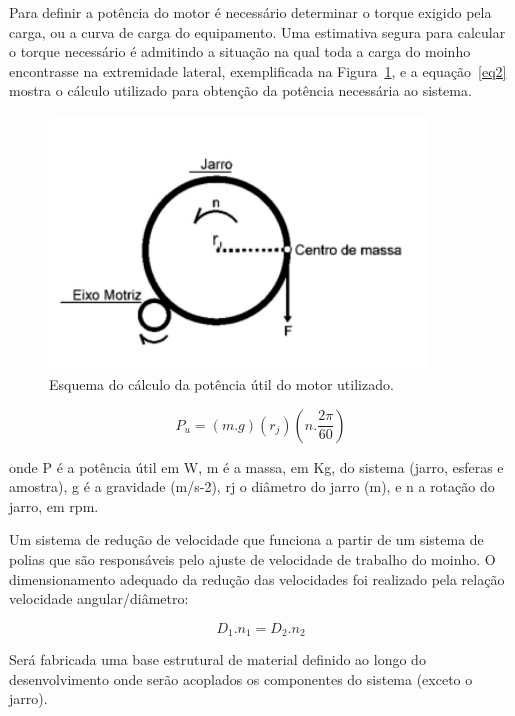 \documentclass[a4paper, 12pt, brazil]{article}
\begin{document}
Para definir a potência do motor é necessário determinar o torque exigido pela carga, ou a curva de carga do equipamento. Uma estimativa segura para calcular o torque necessário é admitindo a situação na qual toda a carga do moinho encontrasse na extremidade lateral, exemplificada na Figura~\ref{fig:potencia}, e a equação~\ref{eq2} mostra o cálculo utilizado para obtenção da potência necessária ao sistema.

\begin{figure}[!ht]
 			\begin{center}
				\includegraphics[width=100mm,scale=0.5]{potencia.png}
			\end{center}
       		\caption{\label{fig:potencia}Esquema do cálculo da potência útil do motor utilizado.}
 	\end{figure}   

\begin{equation}
P_u=(m.g)(r_j)(n.\frac{2\pi}{60})
\label{eq2}
\end{equation}

\par
onde P é a potência útil em W, m é a massa, em Kg, do sistema (jarro, esferas e amostra), g é a gravidade (m/s-2), rj o diâmetro do jarro (m), e n a rotação do jarro, em rpm.
\newline

Um sistema de redução de velocidade que funciona a partir de um sistema de polias que são responsáveis pelo ajuste de velocidade de trabalho do moinho. O dimensionamento adequado da redução das velocidades foi realizado pela relação velocidade angular/diâmetro: 

\begin{equation}
D_1.n_1=D_2.n_2
\end{equation}

\par
Será fabricada uma base estrutural de material definido ao longo do desenvolvimento onde serão acoplados os componentes do sistema (exceto o jarro). 
\end{document}
